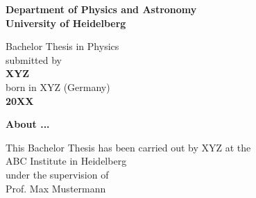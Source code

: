\begin{titlepage}
\begin{center}
 
\Large\textbf{Department of Physics and Astronomy\\
University of Heidelberg}

\vspace{18cm}

\normalsize
Bachelor Thesis in Physics\\
submitted by\\
\vspace{0.5cm}
\Large\textbf{XYZ}\\
\normalsize
\vspace{0.5cm}
born in XYZ (Germany)\\
\vspace{0.5cm}
\Large\textbf{20XX}
\normalsize

\newpage




\Large\textbf{About ...}

\vspace{18cm}

\normalsize
This Bachelor Thesis has been carried out by XYZ at the\\
ABC Institute in Heidelberg\\
under the supervision of\\
Prof. Max Mustermann

\vfill
\end{center}

\end{titlepage}
